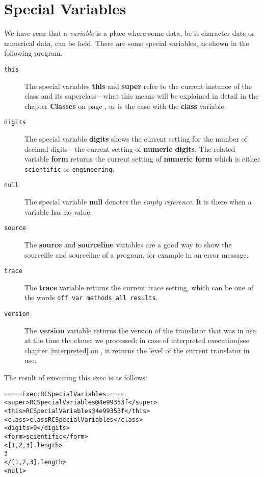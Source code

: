 {\section{Special Variables}
We have seen that a \emph{variable} is a place where some data, be it
character date or numerical data, can be held. There are some special
variables, as shown in the following program.

\begin{description}
\item[\texttt{this}] The special variables \textbf{this} and \textbf{super} refer to the
current instance of the class and its superclass - what this means
will be explained in detail in the chapter \textbf{Classes} on page
\pageref{classes}, as is the case with the \textbf{class} variable.

\item[\texttt{digits}]The special variable \textbf{digits} shows the current setting for the
number of decimal digits - the current setting of \textbf{numeric
  digits}. The related variable \textbf{form} returns the current
setting of \textbf{numeric form} which is either \texttt{scientific}
or \texttt{engineering}.

\item[\texttt{null}]The special variable \textbf{null} denotes the \emph{empty
  reference}. It is there when a variable has no value.

\item[\texttt{source}]The \textbf{source} and \textbf{sourceline} variables are a good way to
show the sourcefile and sourceline of a program, for example in an
error message.

\item[\texttt{trace}]The \textbf{trace} variable returns the current trace setting, which
can be one of the words \texttt{off var methods all results}. 

\item[\texttt{version}]The \textbf{version} variable returns the version of the \nr{}
translator that was in use at the time the clause we processed; in
case of interpreted execution(see chapter \ref{interpreted} on \pageref{interpreted}, it returns
the level of the current translator in use. 
\end{description}
The result of executing this exec is as follows:
\begin{alltt}
===== Exec: RCSpecialVariables =====
<super>RCSpecialVariables@4e99353f</super>
<this>RCSpecialVariables@4e99353f</this>
<class>class RCSpecialVariables</class>
<digits>9</digits>
<form>scientific</form>
<[1, 2, 3].length>
3
</[1, 2, 3].length>
<null>


\end{alltt}}
